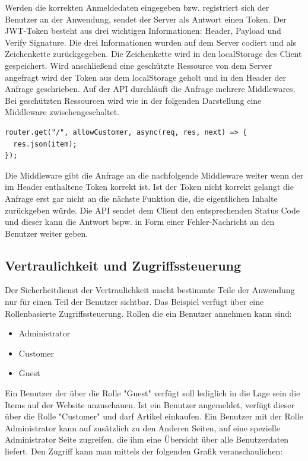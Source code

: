 \documentclass[utf8,biblatex]{lni}
\begin{document}
Werden die korrekten Anmeldedaten eingegeben bzw. registriert sich der Benutzer an der 
Anwendung, sendet der Server als Antwort einen Token. 
Der JWT-Token besteht aus drei wichtigen Informationen: Header, Payload und Verify Signature.
Die drei Informationen wurden auf dem Server codiert und als Zeichenkette zurückgegeben. 
Die Zeichenkette wird in den localStorage des Client gespeichert. Wird anschließend eine 
geschützte Ressource von dem Server angefragt wird der Token aus dem localStorage geholt 
und in den Header der Anfrage geschrieben.
Auf der API durchläuft die Anfrage mehrere Middlewares. 
Bei geschützten Ressourcen wird wie in der folgenden Darstellung eine Middleware 
zwischengeschaltet. 

\begin{verbatim}
router.get("/", allowCustomer, async(req, res, next) => {
  res.json(item);
});
\end{verbatim}

Die Middleware gibt die Anfrage an die nachfolgende Middleware weiter wenn der im Header enthaltene 
Token korrekt ist. Ist der Token nicht korrekt gelangt die Anfrage erst gar nicht an die nächste Funktion die,
die eigentlichen Inhalte zurückgeben würde. 
Die API sendet dem Client den entsprechenden Status Code und dieser kann die Antwort bspw. in Form 
einer Fehler-Nachricht an den Benutzer weiter geben. 

\subsection{Vertraulichkeit und Zugriffssteuerung}

Der Sicherheitdienst der Vertraulichkeit macht bestimmte Teile der Anwendung nur für einen Teil der Benutzer sichtbar. 
Das Beispiel verfügt über eine Rollenbasierte Zugriffssteuerung. 
Rollen die ein Benutzer annehmen kann sind: 
\begin{itemize}
  \item Administrator
  \item Customer
  \item Guest
\end{itemize}

Ein Benutzer der über die Rolle "Guest" verfügt soll lediglich in die Lage sein die Items auf der Website anzuschauen. 
Ist ein Benutzer angemeldet, verfügt dieser über die Rolle "Customer" und darf Artikel einkaufen. 
Ein Benutzer mit der Rolle Administrator kann auf zusätzlich zu den Anderen Seiten, auf eine spezielle Administrator Seite zugreifen, die ihm eine Übersicht über 
alle Benutzerdaten liefert. 
Den Zugriff kann man mittels der folgenden Grafik veranschaulichen:
\end{document}
